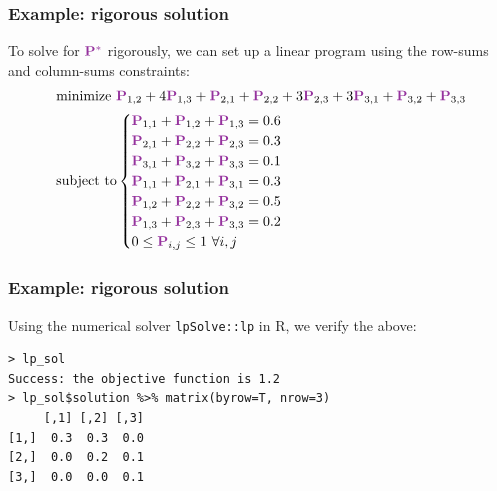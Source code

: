 \documentclass[mathserif,compress,xcolor={dvipsnames}]{beamer}
\newcommand*\ba{\[ \begin{aligned}}
\newcommand*\ea{\end{aligned} \]}
\renewcommand\;{\,}
\begin{document}
\begin{frame}[fragile]\frametitle{Example: rigorous solution}
\small
To solve for ${\color{Purple} \mathbf P^*}$ rigorously, we can set up a linear program using the row-sums and column-sums constraints:
\bigskip
\ba
\;& \text{minimize} \ {\color{Purple} \mathbf P}_{1,2} + 4{\color{Purple} \mathbf P}_{1,3} + {\color{Purple} \mathbf P}_{2,1} +  {\color{Purple} \mathbf P}_{2, 2} + 3{\color{Purple} \mathbf P}_{2,3} + 3{\color{Purple} \mathbf P}_{3,1} + {\color{Purple} \mathbf P}_{3,2} + {\color{Purple} \mathbf P}_{3, 3} \\
& \text{subject to} \begin{cases}
	 {\color{Purple} \mathbf P}_{1,1} + {\color{Purple} \mathbf P}_{1,2} + {\color{Purple} \mathbf P}_{1,3} = 0.6 \\
	 {\color{Purple} \mathbf P}_{2,1} + {\color{Purple} \mathbf P}_{2,2} + {\color{Purple} \mathbf P}_{2,3} = 0.3 \\
	 {\color{Purple} \mathbf P}_{3,1} + {\color{Purple} \mathbf P}_{3,2} + {\color{Purple} \mathbf P}_{3,3} = 0.1 \\
	 {\color{Purple} \mathbf P}_{1,1} + {\color{Purple} \mathbf P}_{2,1} + {\color{Purple} \mathbf P}_{3,1} = 0.3 \\
	 {\color{Purple} \mathbf P}_{1,2} + {\color{Purple} \mathbf P}_{2,2} + {\color{Purple} \mathbf P}_{3,2} = 0.5 \\
	 {\color{Purple} \mathbf P}_{1,3} + {\color{Purple} \mathbf P}_{2,3} + {\color{Purple} \mathbf P}_{3,3} = 0.2 \\
	 0 \le {\color{Purple} \mathbf P}_{i,j} \le 1 \ \forall i,j 
\end{cases}
\ea
\end{frame}

\begin{frame}[fragile]\frametitle{Example: rigorous solution}
Using the numerical solver \texttt{lpSolve::lp} in R, we verify the above:
\bigskip
\begin{lstlisting}
> lp_sol                      
Success: the objective function is 1.2                   
> lp_sol$solution %>% matrix(byrow=T, nrow=3)               
     [,1] [,2] [,3]           
[1,]  0.3  0.3  0.0           
[2,]  0.0  0.2  0.1           
[3,]  0.0  0.0  0.1 
\end{lstlisting}
\end{frame}
\end{document}
